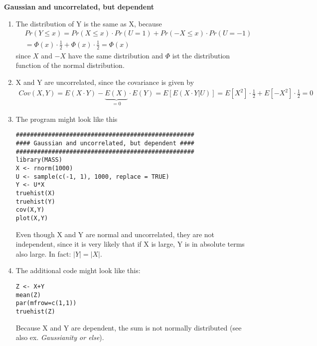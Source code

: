 \begin{Solution}{8.3}
\textbf{Gaussian and uncorrelated, but dependent}

\begin{enumerate}
  \item The distribution of Y is the same as X, because
  \begin{align*}
  &Pr(Y \leq x) = Pr(X\leq x)\cdot Pr(U=1) + Pr(-X\leq x)\cdot Pr(U=-1)\\
  &=\Phi(x) \cdot \frac{1}{2}+ \Phi(x) \cdot \frac{1}{2} = \Phi(x)
  \end{align*}
  since $X$ and $-X$ have the same distribution and $\Phi$ ist the
  distribution function of the normal distribution.
  \item X and Y are uncorrelated, since the covariance is given by
  \begin{align*}
  Cov(X,Y) = E(X\cdot Y) - \underbrace{E(X)}_{=0}\cdot E(Y) = E[E(X \cdot Y|U)] = E[X^2]\cdot \frac{1}{2} + E[-X^2]\cdot \frac{1}{2} = 0
  \end{align*}
  \item The program might look like this
\begin{verbatim}
##################################################
#### Gaussian and uncorrelated, but dependent ####
##################################################
library(MASS)
X <- rnorm(1000)
U <- sample(c(-1, 1), 1000, replace = TRUE)
Y <- U*X
truehist(X)
truehist(Y)
cov(X,Y)
plot(X,Y)
\end{verbatim}
Even though X and Y are normal and uncorrelated, they are not
independent, since it is very likely that if X is large, Y is in absolute
terms also large. In fact: $|Y|=|X|$.
\item The additional code might look like this:
\begin{verbatim}
Z <- X+Y
mean(Z)
par(mfrow=c(1,1))
truehist(Z)
\end{verbatim}
Because X and Y are dependent, the sum is not normally distributed (see
also ex. \emph{Gaussianity or else}).
\end{enumerate}

\end{Solution}
